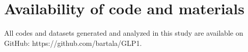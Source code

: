 \documentclass[referee,bst/sn-basic]{sn-jnl}%
\begin{document}
\begin{comment}
Abraham (Avi) Seidmann is the Everett W. Lord Distinguished Faculty Scholar of Information Systems and an Associate Research Director for Health Analytics and Digital Health at the Questrom Digital Business Institute. He is a national expert in Business and Medical Management, social media and digital Health, and Telemedicine. Prof Seidmann has led clinical and economic research in these areas for over 25 years. He has published over one hundred research articles and has over 9,900 research citations. In October 2012, he was named a “Distinguished Fellow” by the Information Systems Society of the Institute of Operations Research and Management Sciences (INFORMS).

\end{comment}


\section*{Availability of code and materials}
All codes and datasets generated and analyzed in this study are available on GitHub: https://github.com/bartala/GLP1. %





% 
 

\newpage

\end{document}
